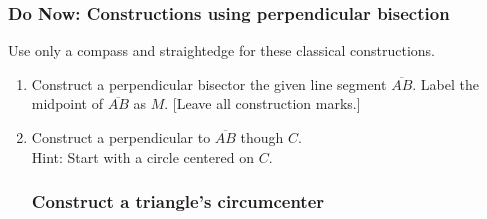 \documentclass[12pt, oneside]{article}
\begin{document}
\subsubsection*{Do Now: Constructions using perpendicular bisection}
Use only a compass and straightedge for these classical constructions.
  \begin{enumerate}

  \item Construct a perpendicular bisector the given line segment $\overline{AB}$. Label the midpoint of $\overline{AB}$ as $M$.  [Leave all construction marks.]\\
    \vspace{1cm}
    \begin{center}
    \end{center}
    \vspace{3cm}

  \item Construct a perpendicular to $\overline{AB}$ though $C$.\\
  Hint: Start with a circle centered on $C$.
    \vspace{4cm}
    \begin{center}
  \end{center} %

\newpage
\subsubsection*{Construct a triangle's circumcenter}


\end{enumerate}
\end{document}

